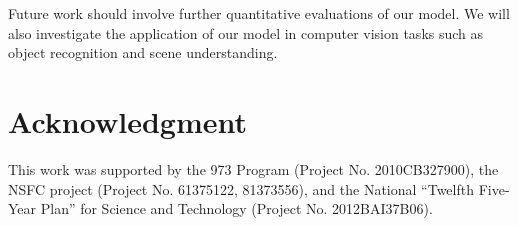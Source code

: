 \documentclass[conference]{IEEEtran}
\begin{document}
Future work should involve further quantitative evaluations of our model.
We will also investigate the application of our model in computer vision tasks
such as object recognition and scene understanding.

\section*{Acknowledgment}

This work was supported by the 973 Program (Project No. 2010CB327900), 
the NSFC project (Project No. 61375122, 81373556), 
and the National ``Twelfth Five-Year Plan'' for Science and Technology (Project No. 2012BAI37B06).



\end{document}
